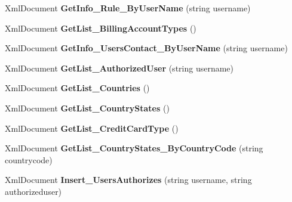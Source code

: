 \begin{DoxyCompactItemize}
\item 
\hypertarget{class_data_service_a02a381a9505469814d5381baf638ec9d}{Xml\-Document {\bfseries Get\-Info\-\_\-\-Rule\-\_\-\-By\-User\-Name} (string username)}\label{class_data_service_a02a381a9505469814d5381baf638ec9d}

\item 
\hypertarget{class_data_service_aacd7dd284186b4392d62254ec90dd461}{Xml\-Document {\bfseries Get\-List\-\_\-\-Billing\-Account\-Types} ()}\label{class_data_service_aacd7dd284186b4392d62254ec90dd461}

\item 
\hypertarget{class_data_service_ae337f1b760ec16ab6dbba01c87e7d437}{Xml\-Document {\bfseries Get\-Info\-\_\-\-Users\-Contact\-\_\-\-By\-User\-Name} (string username)}\label{class_data_service_ae337f1b760ec16ab6dbba01c87e7d437}

\item 
\hypertarget{class_data_service_aad1b20cc373db62955a96e9e655a66b3}{Xml\-Document {\bfseries Get\-List\-\_\-\-Authorized\-User} (string username)}\label{class_data_service_aad1b20cc373db62955a96e9e655a66b3}

\item 
\hypertarget{class_data_service_ae05cb77ba2cea45e537c82e60403b895}{Xml\-Document {\bfseries Get\-List\-\_\-\-Countries} ()}\label{class_data_service_ae05cb77ba2cea45e537c82e60403b895}

\item 
\hypertarget{class_data_service_a94dc766f12634aa0c1d0e90d906bd333}{Xml\-Document {\bfseries Get\-List\-\_\-\-Country\-States} ()}\label{class_data_service_a94dc766f12634aa0c1d0e90d906bd333}

\item 
\hypertarget{class_data_service_a38798787831e7d83dfaca712b5d8da8b}{Xml\-Document {\bfseries Get\-List\-\_\-\-Credit\-Card\-Type} ()}\label{class_data_service_a38798787831e7d83dfaca712b5d8da8b}

\item 
\hypertarget{class_data_service_a461aa7b72d9db4100619f39d57b59202}{Xml\-Document {\bfseries Get\-List\-\_\-\-Country\-States\-\_\-\-By\-Country\-Code} (string countrycode)}\label{class_data_service_a461aa7b72d9db4100619f39d57b59202}

\item 
\hypertarget{class_data_service_acd21346bc33a7e622a8d604ca2446a5f}{Xml\-Document {\bfseries Insert\-\_\-\-Users\-Authorizes} (string username, string authorizeduser)}\label{class_data_service_acd21346bc33a7e622a8d604ca2446a5f}


\end{DoxyCompactItemize}
